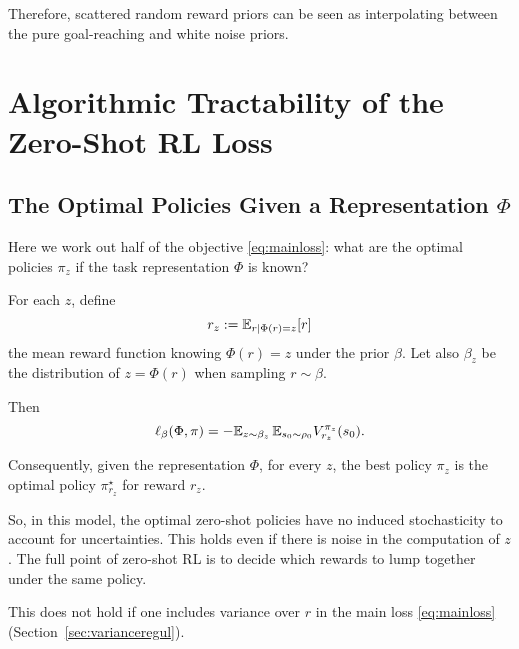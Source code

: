\documentclass[11pt,a4paper]{article}
\begin{document}
Therefore, scattered random reward priors can be seen as interpolating
between the pure goal-reaching and white noise priors.

\section{Algorithmic Tractability of the Zero-Shot RL Loss}

\subsection{The Optimal Policies Given a Representation $\Phi$}

Here we work out half of the objective \eqref{eq:mainloss}: what are the
optimal policies
$\pi_z$ if the task representation $\Phi$ is
known?

\begin{prop}
\label{prop:posteriormean}
For each $z$, define
\begin{equation}
\label{eq:postreward}
r_z\mathrel{\mathop{:}}= \mathbb{E}_{r|\Phi(r)=z} [r]
\end{equation}
the mean reward function knowing $\Phi(r)=z$ under the prior $\beta$. Let
also $\beta_z$ be the distribution of $z=\Phi(r)$ when sampling $r\sim
\beta$.

Then
\begin{equation}
\ell_\beta(\Phi,\pi)=-\mathbb{E}_{z\sim \beta_z}\,\mathbb{E}_{s_0\sim \rho_0} V^{\pi_z}_{r_z}(s_0).
\end{equation}

Consequently, given the representation $\Phi$, for every $z$, the best policy $\pi_z$ is the optimal
policy $\pi^\star_{r_z}$ for reward $r_z$.
\end{prop}

So, in this model, the optimal zero-shot policies have no induced stochasticity to account for
uncertainties. This holds even if there is noise in the computation of
$z$. The full point of zero-shot RL is to decide which rewards to lump together under the
same policy.

This does not hold if one includes variance over $r$ in the main loss
\eqref{eq:mainloss} (Section~\ref{sec:varianceregul}).

\end{document}

